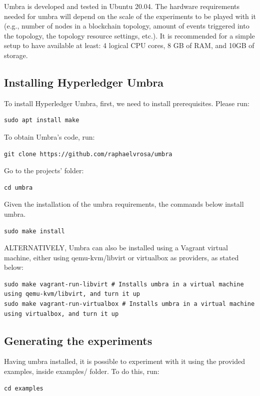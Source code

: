 \documentclass[12pt,a4paper]{article}
\theoremstyle{definition}
\begin{document}
Umbra is developed and tested in Ubuntu 20.04. The hardware requirements needed for umbra will depend on the scale of the experiments to be played with it (e.g., number of nodes in a blockchain topology, amount of events triggered into the topology, the topology resource settings, etc.). It is recommended for a simple setup to have available at least: 4 logical CPU cores, 8 GB of RAM, and 10GB of storage.


\subsection{Installing Hyperledger Umbra}
To install Hyperledger Umbra, first, we need to install prerequisites. Please run: 
\begin{verbatim}
sudo apt install make
\end{verbatim}

To obtain Umbra's code, run:
\begin{verbatim}
git clone https://github.com/raphaelvrosa/umbra
\end{verbatim}

Go to the projects' folder:
\begin{verbatim}
cd umbra
\end{verbatim}

Given the installation of the umbra requirements, the commands below install umbra.
\begin{verbatim}
sudo make install
\end{verbatim}

ALTERNATIVELY, Umbra can also be installed using a Vagrant virtual machine, either using qemu-kvm/libvirt or virtualbox as providers, as stated below:
\begin{verbatim}
sudo make vagrant-run-libvirt # Installs umbra in a virtual machine using qemu-kvm/libvirt, and turn it up
sudo make vagrant-run-virtualbox # Installs umbra in a virtual machine using virtualbox, and turn it up

\end{verbatim}

\subsection{Generating the experiments}
Having umbra installed, it is possible to experiment with it using the provided examples, inside examples/ folder. To do this, run:


\begin{verbatim}
cd examples
\end{verbatim}
\end{document}

